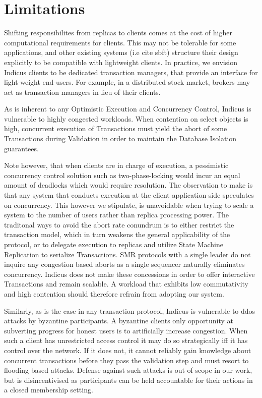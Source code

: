 \section{Limitations}
Shifting responsibilites from replicas to clients comes at the cost of higher computational requirements for clients. This may not be tolerable for some applications, and other existing systems (i.e cite sbft) structure their design explicitly to be compatible with lightweight clients. In practice, we envision Indicus clients to be dedicated transaction managers, that provide an interface for light-weight end-users. For example, in a distributed stock market, brokers may act as transaction managers in lieu of their clients.

As is inherent to any Optimistic Execution and Concurrency Control, Indicus is vulnerable to highly congested workloads. When contention on select objects is high, concurrent execution of Transactions must yield the abort of some Transactions during Validation in order to maintain the Database Isolation guarantees. 

Note however, that when clients are in charge of execution, a pessimistic concurrency control solution such as two-phase-locking would incur an equal amount of deadlocks which would require resolution. The observation to make is that any system that conducts execution at the client application side speculates on concurrency. This however we stipulate, is unavoidable when trying to scale a system to the number of users rather than replica processing power. The traditonal ways to avoid the abort rate conundrum is to either restrict the transaction model, which in turn weakens the general applicability of the protocol, or to delegate execution to replicas and utilize State Machine Replication to serialize Transactions. SMR protocols with a single leader do not inquire any congestion based aborts as a single sequencer naturally eliminates concurrency.
Indicus does not make these concessions in order to offer interactive Transactions and remain scalable. A workload that exhibits low commutativity and high contention should therefore refrain from adopting our system.

Similarly, as is the case in any transaction protocol, Indicus is vulnerable to ddos attacks by byzantine participants. A byzantine clients only opportunity at subverting progress for honest users is to artificially increase congestion. When such a client has unrestricted access control it may do so strategically iff it has control over the network. If it does not, it cannot reliably gain knowledge about concurrent transactions before they pass the validation step and must resort to flooding based attacks. Defense against such attacks is out of scope in our work, but is disincentivised as participants can be held accountable for their actions in a closed membership setting.

